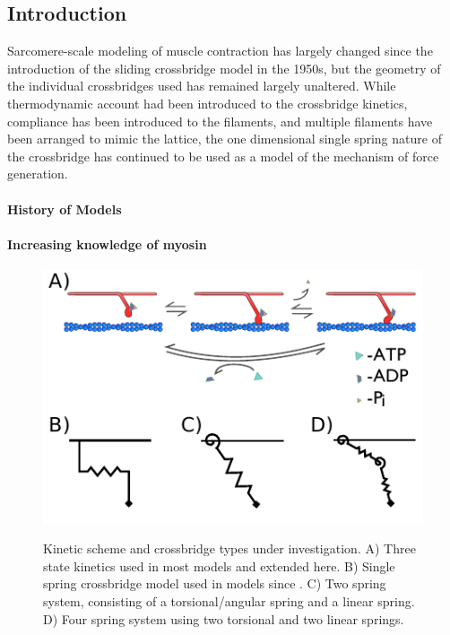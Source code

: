 \documentclass[11pt]{article}
\begin{document}
\begin{multicols}{2}


\section*{Introduction}

Sarcomere-scale modeling of muscle contraction has largely changed since the introduction of the sliding crossbridge model in the 1950s, but the geometry of the individual crossbridges used has remained largely unaltered. While thermodynamic account had been introduced to the crossbridge kinetics, compliance has been introduced to the filaments, and multiple filaments have been arranged to mimic the lattice, the one dimensional single spring nature of the crossbridge has continued to be used as a model of the mechanism of force generation.

\paragraph*{History of Models}

\paragraph*{Increasing knowledge of myosin}

\begin{figure}[H]
    \begin{center}
    \includegraphics{../imgs/XBCycle.pdf}
    \label{fig:xbtypes}
    \caption{{\small 
        Kinetic scheme and crossbridge types under investigation. 
        A) Three state kinetics used in most models and extended here. 
        B) Single spring crossbridge model used in models since \cite{Huxley1957e}. 
        C) Two spring system, consisting of a torsional/angular spring and a linear spring. 
        D) Four spring system using two torsional and two linear springs.}}
    \end{center}
\end{figure}


\end{multicols}
\end{document}

